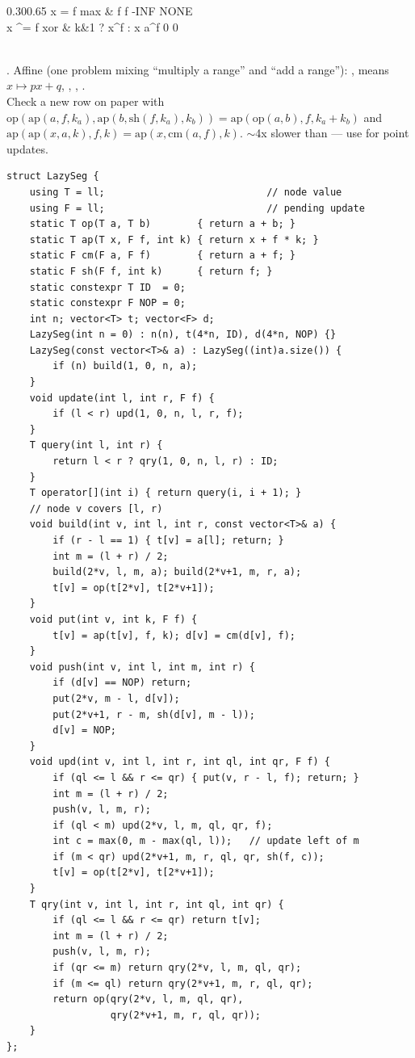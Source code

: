 {{\begin{ctab}{0.30}{0.65}
x = f \hfill max & f \hfill f \hfill -INF \hfill NONE\\
x \textasciicircum= f \hfill xor & k\&1 ? x\textasciicircum f : x \hfill a\textasciicircum f \hfill 0 \hfill 0\\
\end{ctab}}\\[0.3ex]
. Affine (one problem mixing ``multiply a range'' and ``add a
range''): ,  means $x \mapsto px+q$,
, , .\\[0.3ex]
Check a new row on paper with
$\mathrm{op}(\mathrm{ap}(a,f,k_a), \mathrm{ap}(b,\mathrm{sh}(f,k_a),k_b)) = \mathrm{ap}(\mathrm{op}(a,b), f, k_a{+}k_b)$
and $\mathrm{ap}(\mathrm{ap}(x,a,k),f,k) = \mathrm{ap}(x,\mathrm{cm}(a,f),k)$.
$\sim$4x slower than  --- use  for point updates.}

\begin{lstlisting}
struct LazySeg {
    using T = ll;                            // node value
    using F = ll;                            // pending update
    static T op(T a, T b)        { return a + b; }
    static T ap(T x, F f, int k) { return x + f * k; }
    static F cm(F a, F f)        { return a + f; }
    static F sh(F f, int k)      { return f; }
    static constexpr T ID  = 0;
    static constexpr F NOP = 0;
    int n; vector<T> t; vector<F> d;
    LazySeg(int n = 0) : n(n), t(4*n, ID), d(4*n, NOP) {}
    LazySeg(const vector<T>& a) : LazySeg((int)a.size()) {
        if (n) build(1, 0, n, a);
    }
    void update(int l, int r, F f) {
        if (l < r) upd(1, 0, n, l, r, f);
    }
    T query(int l, int r) {
        return l < r ? qry(1, 0, n, l, r) : ID;
    }
    T operator[](int i) { return query(i, i + 1); }
    // node v covers [l, r)
    void build(int v, int l, int r, const vector<T>& a) {
        if (r - l == 1) { t[v] = a[l]; return; }
        int m = (l + r) / 2;
        build(2*v, l, m, a); build(2*v+1, m, r, a);
        t[v] = op(t[2*v], t[2*v+1]);
    }
    void put(int v, int k, F f) {
        t[v] = ap(t[v], f, k); d[v] = cm(d[v], f);
    }
    void push(int v, int l, int m, int r) {
        if (d[v] == NOP) return;
        put(2*v, m - l, d[v]);
        put(2*v+1, r - m, sh(d[v], m - l));
        d[v] = NOP;
    }
    void upd(int v, int l, int r, int ql, int qr, F f) {
        if (ql <= l && r <= qr) { put(v, r - l, f); return; }
        int m = (l + r) / 2;
        push(v, l, m, r);
        if (ql < m) upd(2*v, l, m, ql, qr, f);
        int c = max(0, m - max(ql, l));   // update left of m
        if (m < qr) upd(2*v+1, m, r, ql, qr, sh(f, c));
        t[v] = op(t[2*v], t[2*v+1]);
    }
    T qry(int v, int l, int r, int ql, int qr) {
        if (ql <= l && r <= qr) return t[v];
        int m = (l + r) / 2;
        push(v, l, m, r);
        if (qr <= m) return qry(2*v, l, m, ql, qr);
        if (m <= ql) return qry(2*v+1, m, r, ql, qr);
        return op(qry(2*v, l, m, ql, qr),
                  qry(2*v+1, m, r, ql, qr));
    }
};
\end{lstlisting}

